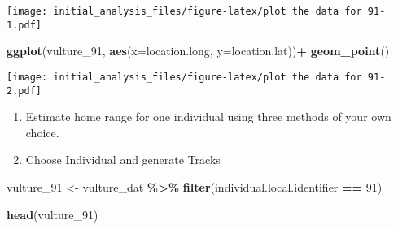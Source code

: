 \documentclass[
]{article}
\newenvironment{Shaded}{\begin{snugshade}}{\end{snugshade}}
\newcommand{\AttributeTok}[1]{\textcolor[rgb]{0.13,0.29,0.53}{#1}}
\newcommand{\DecValTok}[1]{\textcolor[rgb]{0.00,0.00,0.81}{#1}}
\newcommand{\FunctionTok}[1]{\textcolor[rgb]{0.13,0.29,0.53}{\textbf{#1}}}
\newcommand{\NormalTok}[1]{#1}
\newcommand{\OtherTok}[1]{\textcolor[rgb]{0.56,0.35,0.01}{#1}}
\newcommand{\SpecialCharTok}[1]{\textcolor[rgb]{0.81,0.36,0.00}{\textbf{#1}}}
\begin{document}
\texttt{[image: initial\_analysis\_files/figure-latex/plot the data for 91-1.pdf]}

\begin{Shaded}
\begin{Highlighting}[]
\FunctionTok{ggplot}\NormalTok{(vulture\_91, }\FunctionTok{aes}\NormalTok{(}\AttributeTok{x=}\NormalTok{location.long, }\AttributeTok{y=}\NormalTok{location.lat))}\SpecialCharTok{+} \FunctionTok{geom\_point}\NormalTok{()}
\end{Highlighting}
\end{Shaded}

\texttt{[image: initial\_analysis\_files/figure-latex/plot the data for 91-2.pdf]}

\begin{enumerate}
\def\labelenumi{\arabic{enumi}.}
\setcounter{enumi}{1}
\item
  Estimate home range for one individual using three methods of your own
  choice.
\item
  Choose Individual and generate Tracks
\end{enumerate}

\begin{Shaded}
\begin{Highlighting}[]
\NormalTok{vulture\_91 }\OtherTok{\textless{}{-}}\NormalTok{ vulture\_dat }\SpecialCharTok{\%\textgreater{}\%}
  \FunctionTok{filter}\NormalTok{(individual.local.identifier }\SpecialCharTok{==} \DecValTok{91}\NormalTok{)}

\FunctionTok{head}\NormalTok{(vulture\_91)}
\end{Highlighting}
\end{Shaded}
\end{document}
